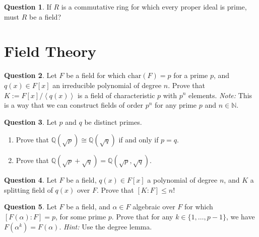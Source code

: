 \documentclass[11pt]{article}
\def\mbb{\mathbb}
\def\R{\mbb{R}}
\def\Q{\mbb{Q}}
\def\N{\mbb{N}}
\def\Char{\mathrm{char}}
\newcommand{\Ang}[1]{\left\langle #1 \right\rangle}
\theoremstyle{pink}
\theoremstyle{boxedsolution}
\theoremstyle{definition}
\newtheorem{question}{Question}
\theoremstyle{claim}
\begin{document}

\begin{question}
If $R$ is a commutative ring for which every proper ideal is prime, must $R$ be a field?
\end{question}

\section*{Field Theory}

\setcounter{question}{0}

\begin{question}
    Let $F$ be a field for which $\Char(F) = p$ for a prime $p$, and $q(x) \in F[x]$ an irreducible polynomial of degree $n$. Prove that $K := F[x] / \Ang{q(x)}$ is a field of characteristic $p$ with $p^n$ elements. \textit{Note:} This is a way that we can construct fields of order $p^n$ for any prime $p$ and $n \in \N$.
\end{question}

\begin{question}
    Let $p$ and  $q$ be distinct primes.
    \begin{enumerate}[label=(\alph*)]
        \item Prove that $\Q(\sqrt{p}) \cong \Q(\sqrt{q})$ if and only if $p = q$. 

        \item Prove that $\Q(\sqrt{p} + \sqrt{q}) = \Q(\sqrt{p}, \sqrt{q})$.
    \end{enumerate}
\end{question}

\begin{question}
    Let $F$ be a field, $q(x) \in F[x]$ a polynomial of degree $n$, and $K$ a splitting field of $q(x)$ over $F$. Prove that $[K:F] \leq n!$
\end{question}

\begin{question}
    Let $F$ be a field, and $\alpha \in F$ algebraic over $F$ for which $[F(\alpha): F] = p$, for some prime $p$. Prove that for any $k \in \{1, \dots, p-1\}$, we have $F(\alpha^k) = F(\alpha)$. \textit{Hint:} Use the degree lemma.
\end{question}
\end{document}

